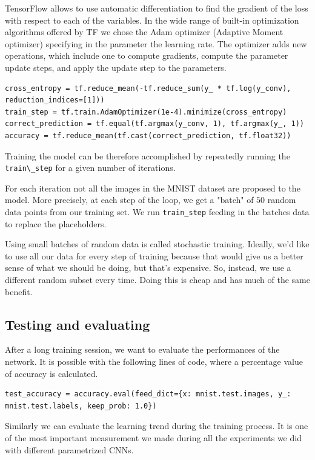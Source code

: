 TensorFlow allows to use automatic differentiation to find the gradient of the loss with respect to each of the variables. In the wide range of built-in optimization algorithms offered by \acs{TF} we chose the Adam optimizer (Adaptive Moment optimizer) specifying in the parameter the learning rate. The optimizer adds new operations, which include one to compute gradients, compute  the parameter update steps, and apply  the update step to the parameters.

\begin{lstlisting}
cross_entropy = tf.reduce_mean(-tf.reduce_sum(y_ * tf.log(y_conv), reduction_indices=[1]))
train_step = tf.train.AdamOptimizer(1e-4).minimize(cross_entropy)
correct_prediction = tf.equal(tf.argmax(y_conv, 1), tf.argmax(y_, 1))
accuracy = tf.reduce_mean(tf.cast(correct_prediction, tf.float32))
\end{lstlisting}

Training the model can be therefore accomplished by repeatedly running the \lstinline|train\_step| for a given number of iterations.

For each iteration not all the images in the \acs{MNIST} dataset are proposed to the model. More precisely, at each step of the loop, we get a "batch" of $50$ random data points from our training set. We run \lstinline|train_step| feeding in the batches data to replace the placeholders.

Using small batches of random data is called stochastic training. Ideally, we'd like to use all our data for every step of training because that would give us a better sense of what we should be doing, but that's expensive. So, instead, we use a different random subset every time. Doing this is cheap and has much of the same benefit.

\subsection{Testing and evaluating}

After a long training session, we want to evaluate the performances of the network. It is possible with the following lines of code, where a percentage value of accuracy is calculated.

\begin{lstlisting}
test_accuracy = accuracy.eval(feed_dict={x: mnist.test.images, y_: mnist.test.labels, keep_prob: 1.0})
\end{lstlisting}

Similarly we can evaluate the learning trend during the training process. It is one of the most important measurement we made during all the experiments we did with different parametrized \acsp{CNN}.

